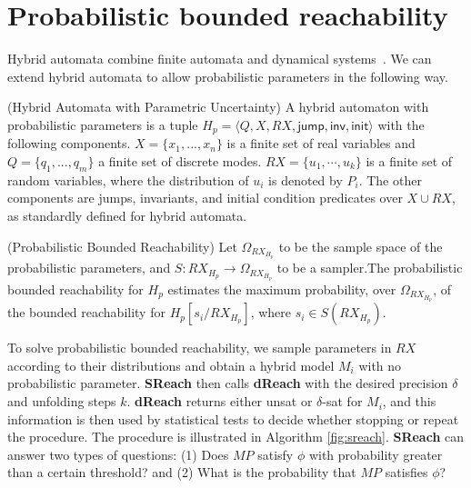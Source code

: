 \section{Probabilistic bounded reachability}
\vspace{-.25cm}
Hybrid automata combine finite automata and dynamical systems~\cite{henzinger2000theory}. We can extend hybrid automata to allow probabilistic parameters in the following way. 
\vspace{-.2cm}
\begin{definition}
\label{def:ha}
{\rm(Hybrid Automata with Parametric Uncertainty)} A hybrid automaton with probabilistic parameters is a tuple $H_p = \langle Q,X,RX,\mathsf{jump},\mathsf{inv},\mathsf{init}\rangle$
with the following components. $X = \{x_1,...,x_n\}$ is a finite set of real variables and $Q=\{q_1,...,q_m\}$ a finite set of discrete modes. $RX = \{ u_1, \cdots, u_k \}$ is a finite set of random variables, where the distribution of $u_i$ is denoted by $P_i$. The other components are jumps, invariants, and initial condition predicates over $X\cup RX$, as standardly defined for hybrid automata.
\end{definition}
\vspace{-.4cm}
\begin{definition}
\label{def:pbr}
{\rm (Probabilistic Bounded Reachability)}
Let $\Omega_{RX_{H_p}}$ to be the sample space of the probabilistic parameters, and $S: RX_{H_p} \to \Omega_{RX_{H_p}}$ to be a sampler.The probabilistic bounded reachability for $H_p$ estimates the maximum probability, over $\Omega_{RX_{H_p}}$, of the bounded reachability for $H_{p}[s_i/RX_{H_p}]$, where $s_i \in S(RX_{H_p})$.
\end{definition}
\vspace{-.27cm}
To solve probabilistic bounded reachability, we sample parameters in $RX$ according 
to their distributions and obtain a hybrid model $M_i$ with no probabilistic 
parameter. {\bf SReach} then calls {\bf dReach} \cite{gaodelta} with the desired precision $\delta$ and 
unfolding steps $k$. {\bf dReach} returns either unsat or $\delta$-sat for $M_i$, and this information
is then used by statistical tests to decide whether stopping or repeat the procedure. The procedure is illustrated in Algorithm \ref{fig:sreach}. {\bf SReach} can answer two types of questions: (1) Does $MP$ satisfy $\phi$ with probability greater than a certain threshold? and (2) What is the probability that $MP$ satisfies $\phi$?
